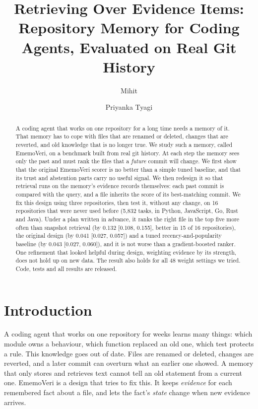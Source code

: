 \documentclass[runningheads]{llncs}
\newcommand{\sys}{EmemoVeri}
\begin{document}
\title{Retrieving Over Evidence Items: Repository Memory for Coding Agents, Evaluated on Real Git History}
\author{Mihit \and Priyanka Tyagi}
\maketitle
\begin{abstract}
A coding agent that works on one repository for a long time needs a memory of it. That memory has to cope with files that are renamed or deleted, changes that are reverted, and old knowledge that is no longer true. We study such a memory, called \sys{}, on a benchmark built from real git history. At each step the memory sees only the past and must rank the files that a \emph{future} commit will change. We first show that the original \sys{} scorer is no better than a simple tuned baseline, and that its trust and abstention parts carry no useful signal. We then redesign it so that retrieval runs on the memory's evidence records themselves: each past commit is compared with the query, and a file inherits the score of its best-matching commit. We fix this design using three repositories, then test it, without any change, on 16 repositories that were never used before (5{,}832 tasks, in Python, JavaScript, Go, Rust and Java). Under a plan written in advance, it ranks the right file in the top five more often than snapshot retrieval (by 0.132 [0.108, 0.155], better in 15 of 16 repositories), the original design (by 0.041 [0.027, 0.057]) and a tuned recency-and-popularity baseline (by 0.043 [0.027, 0.060]), and it is not worse than a gradient-boosted ranker. One refinement that looked helpful during design, weighting evidence by its strength, does not hold up on new data. The result also holds for all 48 weight settings we tried. Code, tests and all results are released.
\end{abstract}

\section{Introduction}
A coding agent that works on one repository for weeks learns many things: which module owns a behaviour, which function replaced an old one, which test protects a rule. This knowledge goes out of date. Files are renamed or deleted, changes are reverted, and a later commit can overturn what an earlier one showed. A memory that only stores and retrieves text cannot tell an old statement from a current one. \sys{} is a design that tries to fix this. It keeps \emph{evidence} for each remembered fact about a file, and lets the fact's \emph{state} change when new evidence arrives.
\end{document}
